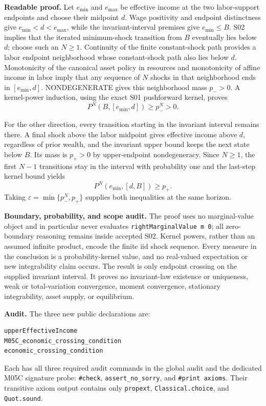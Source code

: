 \documentclass[
  11pt,
]{article}
\let\LedgerOriginalTexttt\texttt
\renewcommand{\texttt}[1]{{\small\LedgerOriginalTexttt{#1}}}
\begin{document}
\textbf{Readable proof.} Let \(e_{\min}\) and \(e_{\max}\) be effective
income at the two labor-support endpoints and choose their midpoint
\(d\). Wage positivity and endpoint distinctness give
\(e_{\min}<d<e_{\max}\), while the invariant-interval premises give
\(e_{\min}\leq B\). S02 implies that the iterated minimum-shock
transition from \(B\) eventually lies below \(d\); choose such an
\(N\geq1\). Continuity of the finite constant-shock path provides a
labor endpoint neighborhood whose constant-shock path also lies below
\(d\). Monotonicity of the canonical asset policy in resources and
monotonicity of affine income in labor imply that any sequence of \(N\)
shocks in that neighborhood ends in \([e_{\min},d]\). NONDEGENERATE
gives this neighborhood mass \(p_->0\). A kernel-power induction, using
the exact S01 pushforward kernel, proves \[
P^N(B,[e_{\min},d])\geq p_-^N>0.
\]

For the other direction, every transition starting in the invariant
interval remains there. A final shock above the labor midpoint gives
effective income above \(d\), regardless of prior wealth, and the
invariant upper bound keeps the next state below \(B\). Its mass is
\(p_+>0\) by upper-endpoint nondegeneracy. Since \(N\geq1\), the first
\(N-1\) transitions stay in the interval with probability one and the
last-step kernel bound yields \[
P^N(e_{\min},[d,B])\geq p_+.
\] Taking \(\varepsilon=\min\{p_-^N,p_+\}\) supplies both inequalities
at the same horizon.

\textbf{Boundary, probability, and scope audit.} The proof uses no
marginal-value object and in particular never evaluates
\texttt{rightMarginalValue\ m\ 0}; all zero-boundary reasoning remains
inside accepted S02. Kernel powers, rather than an assumed infinite
product, encode the finite iid shock sequence. Every measure in the
conclusion is a probability-kernel value, and no real-valued expectation
or new integrability claim occurs. The result is only endpoint crossing
on the supplied invariant interval. It proves no invariant-law existence
or uniqueness, weak or total-variation convergence, moment convergence,
stationary integrability, asset supply, or equilibrium.

\textbf{Audit.} The three new public declarations are:

\begin{verbatim}
upperEffectiveIncome
M05C_economic_crossing_condition
economic_crossing_condition
\end{verbatim}

Each has all three required audit commands in the global audit and the
dedicated M05C signature probe: \texttt{\#check},
\texttt{assert\_no\_sorry}, and \texttt{\#print\ axioms}. Their
transitive axiom output contains only \texttt{propext},
\texttt{Classical.choice}, and \texttt{Quot.sound}.
\end{document}
